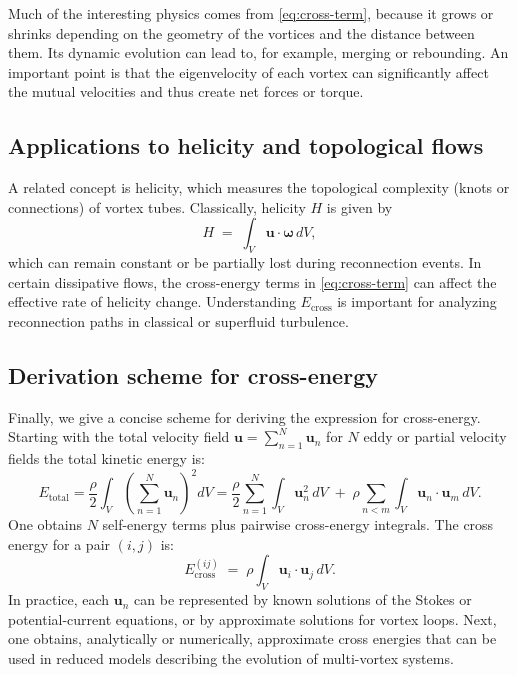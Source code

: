 Much of the interesting physics comes from \eqref{eq:cross-term}, because it
grows or shrinks depending on the geometry of the vortices and the distance between them.
Its dynamic evolution can lead to, for example, merging or rebounding. An important point is that
the eigenvelocity of each vortex can significantly affect the mutual velocities and thus
create net forces or torque.
\subsection{Applications to helicity and topological flows}
\label{sec:helicity}
A related concept is helicity, which measures the topological complexity (knots or
connections) of vortex tubes. Classically, helicity $H$ is given by
\begin{equation}
   H \;=\; \int_V \mathbf{u} \cdot \boldsymbol{\omega}\, dV,\label{eq:appendix:helicity}
\end{equation}
which can remain constant or be partially lost during reconnection events. In certain
dissipative flows, the cross-energy terms in \eqref{eq:cross-term} can affect the effective rate of helicity change. Understanding $E_\text{cross}$ is important
for analyzing reconnection paths in classical or superfluid turbulence.

\subsection{Derivation scheme for cross-energy}
\label{sec:derivation}
Finally, we give a concise scheme for deriving the expression for cross-energy. Starting with the total velocity field $\mathbf{u} = \sum_{n=1}^N \mathbf{u}_n$
for $N$ eddy or partial velocity fields the total kinetic energy is:
\begin{equation}
   E_\text{total}
   = \frac{\rho}{2} \int_V \left(\sum_{n=1}^N \mathbf{u}_n \right)^2 dV
   = \frac{\rho}{2} \sum_{n=1}^N \int_V \mathbf{u}_n^2 \, dV
   \;+\;\rho \sum_{n<m} \int_V \mathbf{u}_n \cdot \mathbf{u}_m \, dV.\label{eq:appendix:total-energy-derivation}
\end{equation}
One obtains $N$ self-energy terms plus pairwise cross-energy integrals.
The cross energy for a pair $(i,j)$ is:
\begin{equation}
   E_\text{cross}^{(ij)} \;=\; \rho \int_V \mathbf{u}_i \cdot \mathbf{u}_j \, dV.\label{eq:appendix:cross-energy-derivation}
\end{equation}
In practice, each $\mathbf{u}_n$ can be represented by known solutions of the Stokes or potential-current equations, or by approximate solutions for vortex loops. Next, one obtains, analytically or numerically, approximate cross energies
that can be used in reduced models describing the evolution of multi-vortex systems.

